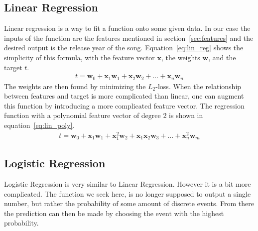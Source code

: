 \documentclass{article}
\begin{document}
\subsection{Linear Regression}\label{sec:lin_reg}
Linear regression is a way to fit a function onto some given data. In our case the inputs of the function are the features mentioned in section~\ref{sec:features} and the desired output is the release year of the song.
Equation~\ref{eq:lin_reg} shows the simplicity of this formula, with the feature vector $\boldsymbol{x}$, the weights $\boldsymbol{w}$, and the target $t$.
\begin{align}
  t = \boldsymbol{w}_0 + \boldsymbol{x}_1\boldsymbol{w}_1 + \boldsymbol{x}_2\boldsymbol{w}_2 + \dots + \boldsymbol{x}_n\boldsymbol{w}_n \label{eq:lin_reg}
\end{align}
The weights are then found by minimizing the $L_2$-loss.
When the relationship between features and target is more complicated than linear, one can augment this function by introducing a more complicated feature vector. The regression function with a polynomial feature vector of degree 2 is shown in equation~\ref{eq:lin_poly}.
\begin{align}
  t = \boldsymbol{w}_0 + \boldsymbol{x}_1\boldsymbol{w}_{1} + \boldsymbol{x}_1^2\boldsymbol{w}_{2} + \boldsymbol{x}_1\boldsymbol{x}_2\boldsymbol{w}_{3} + \dots + \boldsymbol{x}_n^2\boldsymbol{w}_m \label{eq:lin_poly}
\end{align}


\subsection{Logistic Regression}\label{sec:log_reg}
Logistic Regression is very similar to Linear Regression. However it is a bit more complicated. The function we seek here, is no longer supposed to output a single number, but rather the probability of some amount of discrete events. From there the prediction can then be made by choosing the event with the highest probability.
\end{document}
